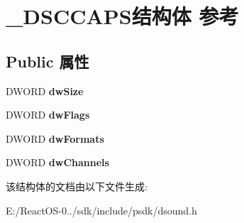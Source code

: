 \hypertarget{struct___d_s_c_c_a_p_s}{}\section{\+\_\+\+D\+S\+C\+C\+A\+P\+S结构体 参考}
\label{struct___d_s_c_c_a_p_s}
\subsection*{Public 属性}
\begin{DoxyCompactItemize}
\item 
\mbox{\label{struct___d_s_c_c_a_p_s_a2f7d12d23c40bb1ac9eb42c4a80b4025}} 
D\+W\+O\+RD {\bfseries dw\+Size}
\item 
\mbox{\label{struct___d_s_c_c_a_p_s_ac09c3eab47c8aa247d03af05e0156bdf}} 
D\+W\+O\+RD {\bfseries dw\+Flags}
\item 
\mbox{\label{struct___d_s_c_c_a_p_s_ac0558c7587efc5f6e5ff29731005c6d9}} 
D\+W\+O\+RD {\bfseries dw\+Formats}
\item 
\mbox{\label{struct___d_s_c_c_a_p_s_a21c93e889bcad7aaa87ee5c810a43154}} 
D\+W\+O\+RD {\bfseries dw\+Channels}
\end{DoxyCompactItemize}


该结构体的文档由以下文件生成\+:\begin{DoxyCompactItemize}
\item 
E\+:/\+React\+O\+S-\/0../sdk/include/psdk/dsound.\+h\end{DoxyCompactItemize}
